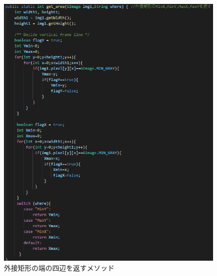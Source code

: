 \begin{itemize}
\begin{figure}[htbp]
\begin{minipage}[t]{0.45\hsize}
      \includegraphics[scale=0.3]{その他3.PNG}
      \centering
      \caption{外接矩形の端の四辺を返すメソッド}
      \label{graph:25}
    \end{minipage}
    \begin{minipage}[t]{0.45\hsize}

\end{minipage}
\end{figure}
\end{itemize}
